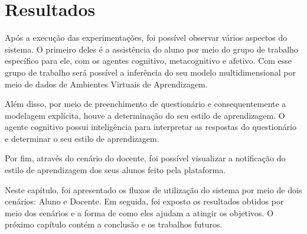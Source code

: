 \section{Resultados}\label{section:resultados}
Após a execução das experimentações, foi possível observar vários aspectos do sistema. O primeiro deles é a assistência do aluno por meio do grupo de trabalho específico para ele, com os agentes cognitivo, metacognitivo e afetivo. Com esse grupo de trabalho será possível a inferência do seu modelo multidimensional por meio de dados de Ambientes Virtuais de Aprendizagem.

Além disso, por meio de preenchimento de questionário e consequentemente a modelagem explícita, houve a determinação do seu estilo de aprendizagem. O agente cognitivo possui inteligência para interpretar as respostas do questionário e determinar o seu estilo de aprendizagem.

Por fim, através do cenário do docente, foi possível visualizar a notificação do estilo de aprendizagem dos seus alunos feito pela plataforma.

Neste capítulo, foi apresentado os fluxos de utilização do sistema por meio de dois cenários: Aluno e Docente. Em seguida, foi exposto os resultados obtidos por meio dos cenários e a forma de como eles ajudam a atingir os objetivos. O próximo capítulo contém a conclusão e os trabalhos futuros.
